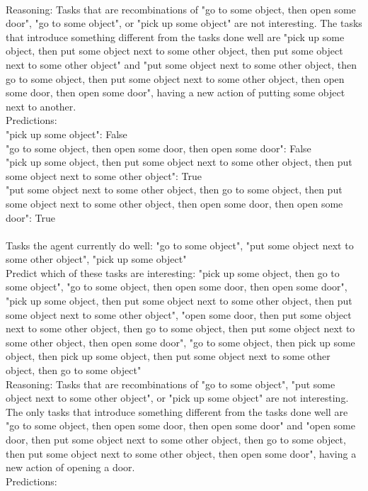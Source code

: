 \documentclass{article} %
\begin{document}
{\\Reasoning: Tasks that are recombinations of "go to some object, then open some door", "go to some object", or "pick up some object" are not interesting. The tasks that introduce something different from the tasks done well are "pick up some object, then put some object next to some other object, then put some object next to some other object" and "put some object next to some other object, then go to some object, then put some object next to some other object, then open some door, then open some door", having a new action of putting some object next to another.
\\Predictions:
\\"pick up some object": False
\\"go to some object, then open some door, then open some door": False
\\"pick up some object, then put some object next to some other object, then put some object next to some other object": True
\\"put some object next to some other object, then go to some object, then put some object next to some other object, then open some door, then open some door": True
\\
\\Tasks the agent currently do well: "go to some object", "put some object next to some other object", "pick up some object"
\\Predict which of these tasks are interesting: "pick up some object, then go to some object", "go to some object, then open some door, then open some door", "pick up some object, then put some object next to some other object, then put some object next to some other object", "open some door, then put some object next to some other object, then go to some object, then put some object next to some other object, then open some door", "go to some object, then pick up some object, then pick up some object, then put some object next to some other object, then go to some object"
\\Reasoning: Tasks that are recombinations of "go to some object", "put some object next to some other object", or "pick up some object" are not interesting. The only tasks that introduce something different from the tasks done well are "go to some object, then open some door, then open some door" and "open some door, then put some object next to some other object, then go to some object, then put some object next to some other object, then open some door", having a new action of opening a door.
\\Predictions:
}
\end{document}

